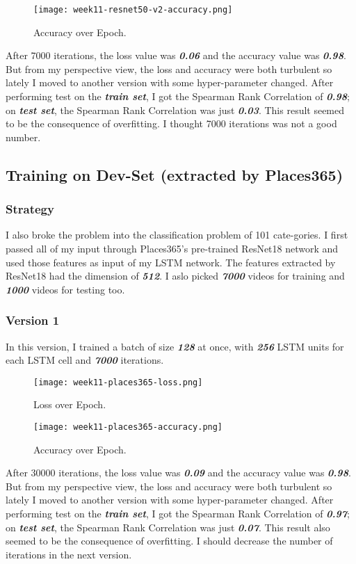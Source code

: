 \begin{figure}[!ht]
\centering
\texttt{[image: week11-resnet50-v2-accuracy.png]}
\caption{Accuracy over Epoch.}
\end{figure}

After 7000 iterations, the loss value was \textbf{\emph{0.06}} and the accuracy value was \textbf{\emph{0.98}}. But from my perspective view, the loss and accuracy were both turbulent so lately I moved to another version with some hyper-parameter changed. After performing test on the \textbf{\emph{train set}}, I got the Spearman Rank Correlation of \textbf{\emph{0.98}}; on \textbf{\emph{test set}}, the Spearman Rank Correlation was just \textbf{\emph{0.03}}. This result seemed to be the consequence of overfitting. I thought 7000 iterations was not a good number.

\subsection{Training on Dev-Set (extracted by Places365)}
\subsubsection{Strategy}
I also broke the problem into the classification problem of 101 cate-gories. I first passed all of my input through Places365's pre-trained ResNet18 network and used those features as input of my LSTM network. The features extracted by ResNet18 had the dimension of \textbf{\emph{512}}. I aslo picked \textbf{\emph{7000}} videos for training and \textbf{\emph{1000}} videos for testing too.

\subsubsection{Version 1}
In this version, I trained a batch of size \textbf{\emph{128}} at once, with \textbf{\emph{256}} LSTM units for each LSTM cell and \textbf{\emph{7000}} iterations.

\begin{figure}[!ht]
\centering
\texttt{[image: week11-places365-loss.png]}
\caption{Loss over Epoch.}
\end{figure}

\begin{figure}[!ht]
\centering
\texttt{[image: week11-places365-accuracy.png]}
\caption{Accuracy over Epoch.}
\end{figure}

After 30000 iterations, the loss value was \textbf{\emph{0.09}} and the accuracy value was \textbf{\emph{0.98}}. But from my perspective view, the loss and accuracy were both turbulent so lately I moved to another version with some hyper-parameter changed. After performing test on the \textbf{\emph{train set}}, I got the Spearman Rank Correlation of \textbf{\emph{0.97}}; on \textbf{\emph{test set}}, the Spearman Rank Correlation was just \textbf{\emph{0.07}}. This result also seemed to be the consequence of overfitting. I should decrease the number of iterations in the next version.